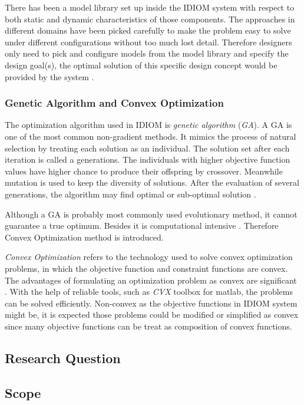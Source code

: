 There has been a model library set up inside the IDIOM system with respect to both static and dynamic characteristics of those components. The approaches in different domains have been picked carefully to make the problem easy to solve under different configurations without too much lost detail. Therefore designers only need to pick and configure models from the model library and specify the design goal(s), the optimal solution of this specific design concept would be provided by the system \cite{Holistic}. 

\subsubsection{Genetic Algorithm and Convex Optimization}
The optimization algorithm used in IDIOM is \textit{genetic algorithm} (\textit{GA}). A GA is one of the most common non-gradient methods. It mimics the process of natural selection by treating each solution as an individual. The solution set after each iteration  is called a generations. The individuals with higher objective function values have higher chance to produce their offspring by crossover. Meanwhile mutation is used to keep the diversity of solutions.  After the evaluation of several generations, the algorithm may find optimal or sub-optimal solution \cite{Nongradient}.

Although a GA is probably most commonly used evolutionary method, it cannot guarantee a true optimum. Besides it is computational intensive \cite{Roos}. Therefore Convex Optimization method is introduced.

\textit{Convex Optimization} refers to the technology used to solve convex optimization problems, in which the objective function and constraint functions are convex. The advantages of formulating an optimization problem as convex are significant \cite{Convex}. With the help of reliable tools, such as \textit{CVX} toolbox \cite{CVXtool} for matlab, the problems can be solved efficiently. Non-convex as the objective functions in IDIOM system might be, it is expected those problems could be modified or simplified as convex since many objective functions can be treat as composition of convex functions.

\subsection{Research Question}


\subsection{Scope}
